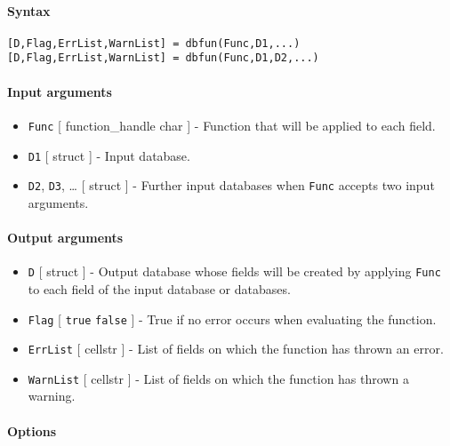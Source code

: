 


	\paragraph{Syntax}

\begin{verbatim}
[D,Flag,ErrList,WarnList] = dbfun(Func,D1,...)
[D,Flag,ErrList,WarnList] = dbfun(Func,D1,D2,...)
\end{verbatim}

\paragraph{Input arguments}

\begin{itemize}
\item
  \texttt{Func} {[} function\_handle \textbar{} char {]} - Function that
  will be applied to each field.
\item
  \texttt{D1} {[} struct {]} - Input database.
\item
  \texttt{D2}, \texttt{D3}, \ldots{} {[} struct {]} - Further input
  databases when \texttt{Func} accepts two input arguments.
\end{itemize}

\paragraph{Output arguments}

\begin{itemize}
\item
  \texttt{D} {[} struct {]} - Output database whose fields will be
  created by applying \texttt{Func} to each field of the input database
  or databases.
\item
  \texttt{Flag} {[} \texttt{true} \textbar{} \texttt{false} {]} - True
  if no error occurs when evaluating the function.
\item
  \texttt{ErrList} {[} cellstr {]} - List of fields on which the
  function has thrown an error.
\item
  \texttt{WarnList} {[} cellstr {]} - List of fields on which the
  function has thrown a warning.
\end{itemize}

\paragraph{Options}

